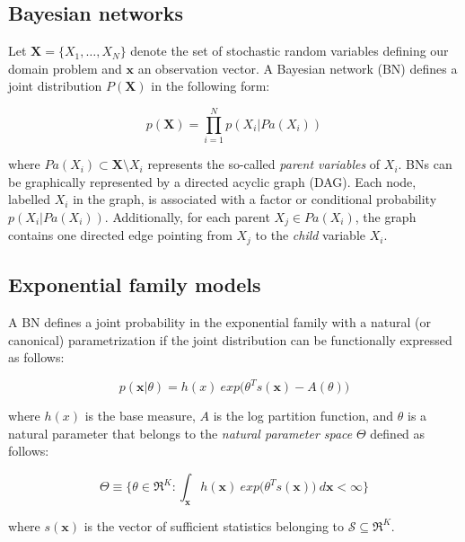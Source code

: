 \documentclass[11pt, oneside]{article}   	%
\newcommand{\bm}{\mathbf}
\numberwithin{figure}{section}
\numberwithin{equation}{section}
\numberwithin{table}{section}
\theoremstyle{definition}
\begin{document}
\subsection*{Bayesian networks}
Let $\bm X = \{X_1,\ldots,X_N\}$ denote the set of stochastic random variables defining our domain problem and $\bm x$ an observation vector. A Bayesian network (BN) defines a joint distribution $P(\bm X)$ in the following form:

$$ p(\bm X) = \prod_{i=1}^N p(X_i|Pa(X_i))$$ 

\noindent where $Pa(X_i)\subset \bm X\setminus X_i$ represents the so-called \emph{parent variables} of $X_i$. BNs can be graphically represented by a directed acyclic graph (DAG). Each node, labelled $X_i$ in the graph, is associated with a factor or conditional probability $p(X_i|Pa(X_i))$. Additionally, for each parent $X_j \in Pa(X_i)$, the graph contains one directed edge pointing from $X_j$ to the \emph{child} variable $X_i$.

\subsection*{Exponential family models}

A BN defines a joint probability in the exponential family with a natural (or canonical) parametrization if the joint distribution can be functionally expressed as follows:

\begin{equation}
\label{Equation:EFCanonical}
p(\bm x | \theta) = h(x)~exp\big(\theta^T s(\bm x) - A(\theta) \big)
\end{equation}

\noindent where $h(x)$ is the base measure, $A$ is the log partition function, and $\theta$ is a natural parameter that belongs to the \emph{natural parameter space} $\Theta$ defined as follows:

\begin{equation}
\label{Equation:NPS}
\Theta \equiv \{ \theta \in\Re^K: \int_{\bm x} h(\bm x)~exp\big(\theta^T s(\bm x) \big)~d\bm x < \infty \}
\end{equation}

\noindent where $s(\bm x)$ is the vector of sufficient statistics belonging to $\mathcal{S} \subseteq\Re^K$.
\end{document}
